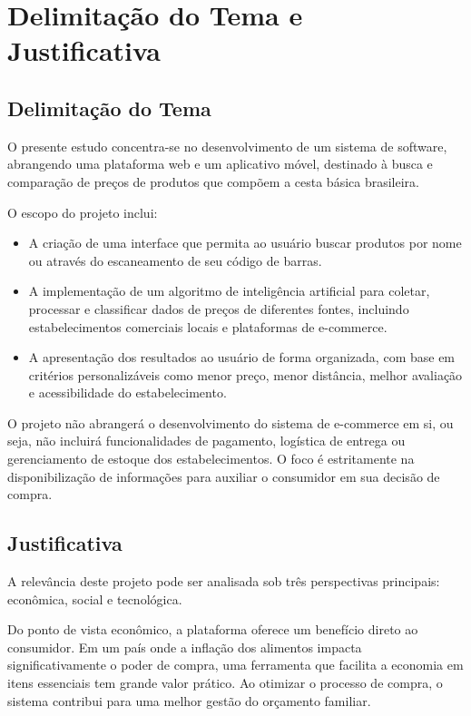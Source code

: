 \documentclass[
  article,
  a4paper,
  12pt,
  oneside,
  fleqn
]{abntex2}
\begin{document}
\section{Delimitação do Tema e Justificativa}

\subsection{Delimitação do Tema}

O presente estudo concentra-se no desenvolvimento de um sistema de software, abrangendo uma plataforma web e um aplicativo móvel, destinado à busca e comparação de preços de produtos que compõem a cesta básica brasileira.

O escopo do projeto inclui:
\begin{itemize}
    \item A criação de uma interface que permita ao usuário buscar produtos por nome ou através do escaneamento de seu código de barras.
    \item A implementação de um algoritmo de inteligência artificial para coletar, processar e classificar dados de preços de diferentes fontes, incluindo estabelecimentos comerciais locais e plataformas de e-commerce.
    \item A apresentação dos resultados ao usuário de forma organizada, com base em critérios personalizáveis como menor preço, menor distância, melhor avaliação e acessibilidade do estabelecimento.
\end{itemize}

O projeto não abrangerá o desenvolvimento do sistema de e-commerce em si, ou seja, não incluirá funcionalidades de pagamento, logística de entrega ou gerenciamento de estoque dos estabelecimentos. O foco é estritamente na disponibilização de informações para auxiliar o consumidor em sua decisão de compra.

\subsection{Justificativa}

A relevância deste projeto pode ser analisada sob três perspectivas principais: econômica, social e tecnológica.

Do ponto de vista econômico, a plataforma oferece um benefício direto ao consumidor. Em um país onde a inflação dos alimentos impacta significativamente o poder de compra, uma ferramenta que facilita a economia em itens essenciais tem grande valor prático. Ao otimizar o processo de compra, o sistema contribui para uma melhor gestão do orçamento familiar.
\end{document}
